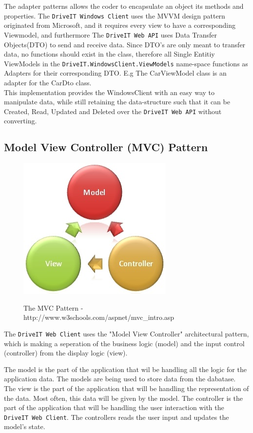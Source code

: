 The adapter patterns allows the coder to encapsulate an object its methods and properties. The \texttt{DriveIT Windows Client} uses the MVVM design pattern originated from Microsoft, and it requires every view to have a corresponding Viewmodel, and furthermore The \texttt{DriveIT Web API} uses Data Transfer Objects(DTO) to send and receive data. Since DTO's are only meant to transfer data, no functions should exist in the class, therefore all Single Entitiy ViewModels in the \texttt{DriveIT.WindowsClient.ViewModels} name-space functions as Adapters for their corresponding DTO. E.g The CarViewModel class is an adapter for the CarDto class.\\ 

This implementation provides the WindowsClient with an easy way to manipulate data, while still retaining the data-structure such that it can be Created, Read, Updated and Deleted over the \texttt{DriveIT Web API} without converting.

\subsection{Model View Controller (MVC) Pattern}
\begin{figure}[H]
	\centering
	\includegraphics[scale=0.6]{Figures/WebImages/MVCPattern}\\
	\caption{The MVC Pattern - http://www.w3schools.com/aspnet/mvc_intro.asp}
	\label{fig:MVCPattern}
\end{figure}
The \texttt{DriveIT Web Client} uses the "Model View Controller" architectural pattern, which is making a seperation of the business logic (model) and the input control (controller) from the display logic (view).

The model is the part of the application that wil be handling all the logic for the application data. The models are being used to store data from the dabatase.
The view is the part of the application that will be handling the representation of the data. Most often, this data will be given by the model.
The controller is the part of the application that will be handling the user interaction with the \texttt{DriveIT Web Client}. The controllers reads the user input and updates the model's state.

